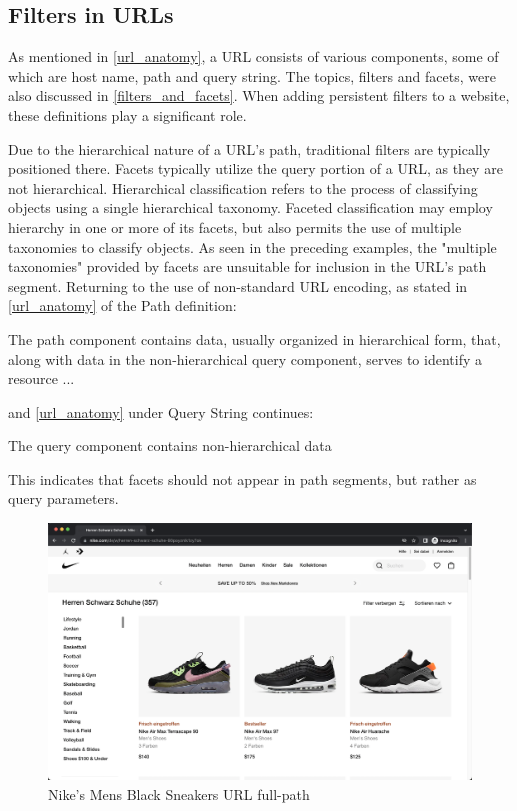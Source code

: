 \subsection*{Filters in URLs}
As mentioned in \autoref{url_anatomy}, a URL consists of various components, some of which are host name, path and query string. The topics, filters and facets, were also discussed in \autoref{filters_and_facets}. When adding persistent filters to a website, these definitions play a significant role.

Due to the hierarchical nature of a URL's path, traditional filters are typically positioned there. Facets typically utilize the query portion of a URL, as they are not hierarchical. Hierarchical classification refers to the process of classifying objects using a single hierarchical taxonomy. Faceted classification may employ hierarchy in one or more of its facets, but also permits the use of multiple taxonomies to classify objects. As seen in the preceding examples, the "multiple taxonomies" provided by facets are unsuitable for inclusion in the URL's path segment. Returning to the use of non-standard URL encoding, as stated in \autoref{url_anatomy} of the Path definition:

\begin{displayquote}
  The path component contains data, usually organized in hierarchical form, that, along with data in the non-hierarchical query component, serves to identify a resource ...
\end{displayquote}

\noindent and \autoref{url_anatomy} under Query String continues:

\begin{displayquote}
  The query component contains non-hierarchical data
\end{displayquote}

\noindent This indicates that facets should not appear in path segments, but rather as query parameters.

\begin{figure}[H]
  \includegraphics[width=\textwidth]{assets/screenshot_nike_website.png}
  \caption{Nike's Mens Black Sneakers URL full-path}
  \label{fig:nikeMensBlackSneakersUrl}
\end{figure}

